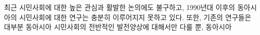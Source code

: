 \documentclass[doctor]{ewhacse}
\begin{document}
%
\begin{summary}
    \fontsize {10.5pt}{10.5pt}
    \selectfont 
	\par    %
	최근 시민사회에 대한 높은 관심과 활발한 논의에도 불구하고, 1990년대 이후의 동아시아의 시민사회에 대한 연구는 충분히 이루어지지 못하고 있다. 또한, 기존의 연구들은 대부분 동아시아 시민사회의 전반적인 발전양상에 대해서만 다룰 뿐, 동아시아
\end{summary}
\end{document}
